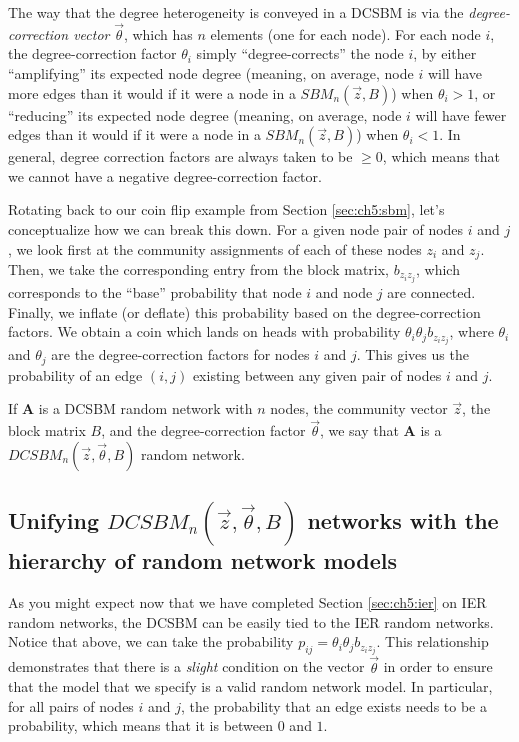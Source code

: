 The way that the degree heterogeneity is conveyed in a DCSBM is via the \textit{degree-correction vector} $\vec\theta$, which has $n$ elements (one for each node). For each node $i$, the degree-correction factor $\theta_i$ simply ``degree-corrects'' the node $i$, by either ``amplifying'' its expected node degree (meaning, on average, node $i$ will have {more} edges than it would if it were a node in a $SBM_n(\vec z, B)$) when $\theta_i > 1$, or ``reducing'' its expected node degree (meaning, on average, node $i$ will have {fewer} edges than it would if it were a node in a $SBM_n(\vec z, B)$) when $\theta_i < 1$. In general, degree correction factors are always taken to be $\geq 0$, which means that we cannot have a negative degree-correction factor. 

Rotating back to our coin flip example from Section \ref{sec:ch5:sbm}, let's conceptualize how we can break this down. For a given node pair of nodes $i$ and $j$, we look first at the community assignments of each of these nodes $z_{i}$ and $z_j$. Then, we take the corresponding entry from the block matrix, $b_{z_i z_j}$, which corresponds to the ``base'' probability that node $i$ and node $j$ are connected. Finally, we inflate (or deflate) this probability based on the degree-correction factors. We obtain a coin which lands on heads with probability $\theta_i \theta_j b_{z_iz_j}$, where $\theta_i$ and $\theta_j$ are the degree-correction factors for nodes $i$ and $j$. This gives us the probability of an edge $(i, j)$ existing between any given pair of nodes $i$ and $j$.

If $\mathbf A$ is a DCSBM random network with $n$ nodes, the community vector $\vec z$, the block matrix $B$, and the degree-correction factor $\vec\theta$, we say that $\mathbf A$ is a $DCSBM_n(\vec z, \vec \theta, B)$ random network. 

\subsection{Unifying $DCSBM_n(\vec z, \vec\theta, B)$ networks with the hierarchy of random network models}

As you might expect now that we have completed Section \ref{sec:ch5:ier} on IER random networks, the DCSBM can be easily tied to the IER random networks. Notice that above, we can take the probability $p_{ij} = \theta_i \theta_j b_{z_i z_j}$. This relationship demonstrates that there is a \textit{slight} condition on the vector $\vec \theta$ in order to ensure that the model that we specify is a valid random network model. In particular, for all pairs of nodes $i$ and $j$, the probability that an edge exists needs to be a probability, which means that it is between $0$ and $1$. 

